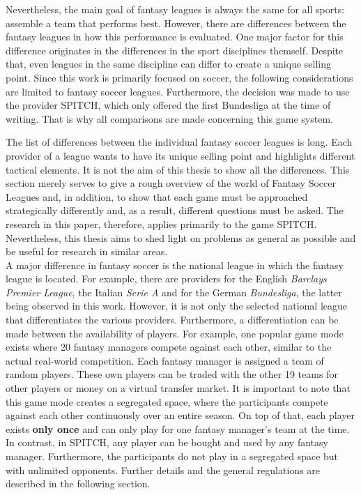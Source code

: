 Nevertheless, the main goal of fantasy leagues is always the same for all sports: assemble a team that performs best. However, there are differences between the fantasy leagues in how this performance is evaluated. One major factor for this difference originates in the differences in the sport disciplines themself. Despite that, even leagues in the same discipline can differ to create a unique selling point. Since this work is primarily focused on soccer, the following considerations are limited to fantasy soccer leagues. Furthermore, the decision was made to use the provider SPITCH, which only offered the first Bundesliga at the time of writing. That is why all comparisons are made concerning this game system. 

The list of differences between the individual fantasy soccer leagues is long. Each provider of a league wants to have its unique selling point and highlights different tactical elements. It is not the aim of this thesis to show all the differences. This section merely serves to give a rough overview of the world of Fantasy Soccer Leagues and, in addition, to show that each game must be approached strategically differently and, as a result, different questions must be asked. The research in this paper, therefore, applies primarily to the game SPITCH. Nevertheless, this thesis aims to shed light on problems as general as possible and be useful for research in similar areas. \\
A major difference in fantasy soccer is the national league in which the fantasy league is located. For example, there are providers for the English \emph{Barclays Premier League}, the Italian \emph{Serie A} and for the German \emph{Bundesliga}, the latter being observed in this work. However, it is not only the selected national league that differentiates the various providers. Furthermore, a differentiation can be made between the availability of players. For example, one popular game mode exists where 20 fantasy managers compete against each other, similar to the actual real-world competition. Each fantasy manager is assigned a team of random players. These own players can be traded with the other 19 teams for other players or money on a virtual transfer market. It is important to note that this game mode creates a segregated space, where the participants compete against each other continuously over an entire season. On top of that, each player exists \textbf{only once} and can only play for one fantasy manager's team at the time. In contrast, in SPITCH, any player can be bought and used by any fantasy manager. Furthermore, the participants do not play in a segregated space but with unlimited opponents. Further details and the general regulations are described in the following section.